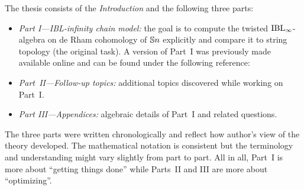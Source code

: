 \documentclass[\MainFolder/Text.tex]{subfiles}
\begin{document}

The thesis consists of the \emph{Introduction} and the following three parts:
\begin{itemize}
 \item \emph{Part I---IBL-infinity chain model:} the goal is to compute the twisted $\mathrm{IBL}_\infty$-algebra on de Rham cohomology of $\mathbb{S}{n}$ explicitly and compare it to string topology (the original task). A version of Part~I was previously made available online and can be found under the following reference: 
\begin{center}
\end{center}
 \item \emph{Part~II---Follow-up topics:} additional topics discovered while working on Part~I.
 \item \emph{Part III---Appendices:} algebraic details of Part~I and related questions.
\end{itemize}

\noindent The three parts were written chronologically and reflect how author's view of the theory developed. The mathematical notation is consistent but the terminology and understanding might vary slightly from part to part. All in all, Part~I is more about ``getting things done'' while Parts~II and III are more about ``optimizing''.
\end{document}
